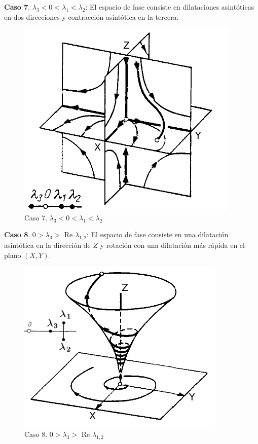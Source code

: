 \documentclass[a4paper,10pt]{article}
\begin{document}
\textbf{Caso 7}. $\lambda_3 < 0 < \lambda_1 < \lambda_2$: El espacio de fase consiste en dilataciones asintóticas
en dos direcciones y contracción asintótica en la tercera.

\begin{figure}[h!]
 \centering
\includegraphics[scale=0.35]{problema3fig8}
\caption{Caso 7. $\lambda_3 < 0 < \lambda_1 < \lambda_2$}
\label{fig:problema3fig8}
\end{figure}
\vspace{.3cm}

\textbf{Caso 8}. $0 > \lambda_3 > $ Re $\lambda_{1,2}$: El espacio de fase consiste en una dilatación asintótica en 
la dirección de $Z$ y rotación con una dilatación más rápida en el plano $(X,Y)$.

\begin{figure}[h!]
 \centering
\includegraphics[scale=0.35]{problema3fig9}
\caption{Caso 8. $0 > \lambda_3 > $ Re $\lambda_{1,2}$}
\label{fig:problema3fig9}
\end{figure}
\vspace{.3cm}
\end{document}
